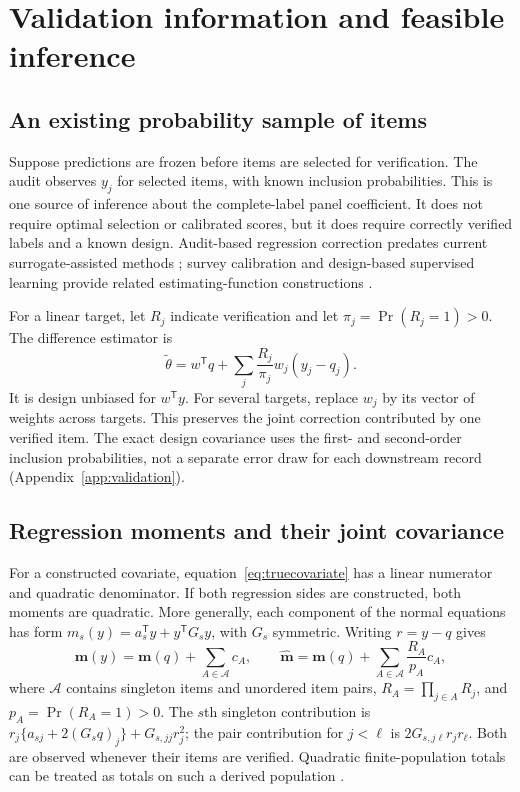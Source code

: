 \section{Validation information and feasible inference}\label{sec:inference}
\subsection{An existing probability sample of items}\label{sec:audit}
Suppose predictions are frozen before items are selected for verification.
The audit observes $y_j$ for selected items, with known inclusion
probabilities. This is one source of inference about the complete-label
panel coefficient. It does not require optimal selection or calibrated
scores, but it does require correctly verified labels and a known design.
Audit-based regression correction predates current surrogate-assisted
methods \citep{shepherd2012audit}; survey calibration and design-based
supervised learning provide related estimating-function constructions
\citep{lumley2011calibration,egami2023}.

For a linear target, let $R_j$ indicate verification and let
$\pi_j=\Pr(R_j=1)>0$. The difference estimator is
\begin{equation}\label{eq:mainauditlinear}
\widetilde\theta=w^{\mathsf T}q+
             \sum_j\frac{R_j}{\pi_j}w_j(y_j-q_j).
\end{equation}
It is design unbiased for $w^{\mathsf T}y$. For several targets, replace
$w_j$ by its vector of weights across targets. This preserves the joint
correction contributed by one verified item. The exact design covariance
uses the first- and second-order inclusion probabilities, not a separate
error draw for each downstream record (Appendix~\ref{app:validation}).

\subsection{Regression moments and their joint covariance}
For a constructed covariate, equation~\eqref{eq:truecovariate} has a linear
numerator and quadratic denominator. If both regression sides are
constructed, both moments are quadratic. More generally, each component of
the normal equations has form
$m_s(y)=a_s^{\mathsf T}y+y^{\mathsf T}G_sy$, with $G_s$ symmetric.
Writing $r=y-q$ gives
\begin{equation}\label{eq:polynomialaudit}
\boldsymbol m(y)=\boldsymbol m(q)+\sum_{A\in\mathcal A}c_A,
\qquad
\widehat{\boldsymbol m}=\boldsymbol m(q)+
                 \sum_{A\in\mathcal A}\frac{R_A}{p_A}c_A,
\end{equation}
where $\mathcal A$ contains singleton items and unordered item pairs,
$R_A=\prod_{j\in A}R_j$, and $p_A=\Pr(R_A=1)>0$. The $s$th singleton
contribution is $r_j\{a_{sj}+2(G_sq)_j\}+G_{s,jj}r_j^2$; the pair
contribution for $j<\ell$ is $2G_{s,j\ell}r_jr_\ell$. Both are observed
whenever their items are verified. Quadratic finite-population totals can
be treated as totals on such a derived population \citep{sitter2002quadratic}.

